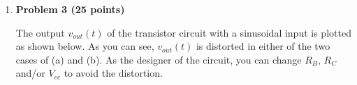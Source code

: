 \begin{enumerate}
\begin{comment}
    Apply KCL to the point between $C_1$ and $C_2$ denoted by $V$:
    \[
    \frac{V_{in}-V}{1/j\omega C_1}+\frac{V_{out}-V}{1/j\omega C_2}
    =\frac{V}{R_2}+\frac{V}{1/j\omega C_1}
    \]
    i.e.,
    \[
    V_{in}j\omega C_1+V_{out}j\omega C_2
    =\left(\frac{1}{R_2}+2j\omega C_1+j\omega C_2\right) V
    =\left(\frac{1}{R_2}+j\omega(2C_1+C_2)\right) V
    \]
    Apply KCL to the inverting input of the op-amp which is virtually
    grounded:
    \[
    \frac{V}{1/j\omega C_1}+\frac{V_{out}}{R_1}=0
    \;\;\;\;\;\;\mbox{i.e.}\;\;\;\;\;\;
    V=-\frac{1}{j\omega R_1C_1}V_{out}
    \]
    Substitute into the first equation
    \begin{eqnarray}
      V_{in}j\omega C_1+V_{out}j\omega C_2
      &=&-\left(\frac{1}{R_2}+j\omega(2C_1+C_2)\right) \frac{1}{j\omega R_1C_1}V_{out}
      \nonumber\\
      &=&-\left(\frac{1}{j\omega R_1R_2C_1}+\frac{2C_1+C_2}{R_1C_1}\right) V_{out}
      \nonumber
    \end{eqnarray}
    Rearrange:
    \[
    V_{in}
    =-\frac{1}{j\omega C_1}\left(j\omega C_2+\frac{1}{j\omega R_1R_2C_1}+\frac{2C_1+C_2}{R_1C_1}\right) V_{out}
    =\left(\frac{C_2}{C_1}+\frac{1}{(j\omega)^2 R_1R_2C^2_1}
    +\frac{2C_1+C_2}{j\omega R_1C_1^2}\right) V_{out}
    \]
    The FRF can be found to be:
    \begin{eqnarray}
      H(j\omega)&=&\frac{V_{out}}{V_{in}}
      =-\left(\frac{C_2}{C_1}+\frac{1}{(j\omega)^2 R_1R_2C_1^2}
      +\frac{2C_1+C_2}{j\omega R_1C_1^2}\right)^{-1}
      =-\frac{(j\omega)^2R_1R_2C_1^2}{(j\omega)^2R_1R_2C_1C_2+j\omega(2C_1+C_2)R_2+1}
      \nonumber\\
      &=&-\frac{C_1}{C_2}\;\frac{(j\omega)^2}{(j\omega)^2+j\omega(2C_1+C_2)/R_1C_1C_2+1/R_1R_2C_1C_2}
      =-\frac{C_1}{C_2}\;\frac{(j\omega)^2}{(j\omega)^2+j\omega\omega_n/Q+\omega_n^2}
      \nonumber
    \end{eqnarray}
    where
    \[
    \omega_n=\frac{1}{\sqrt{R_1R_2C_1C_2}},\;\;\;\;\;\;
    \frac{2C_1+C_2}{R_1C_1C_2}=\frac{\omega_n}{Q}=\Delta\omega,
    \;\;\;\mbox{i.e.,}\;\;\;\;
    Q=\omega_n\frac{R_1C_1C_2}{2C_1+C_2}=\frac{\sqrt{R_1R_2C_1C_2}}{(2C_1+C_2)R_2}
    \]
    This is a 2nd-order high-pass filter, when $\omega=\infty$, we have
    \[
    H(j\omega)\big|_{\omega=\infty}=H(j\infty)=-\frac{C_1}{C_2}
    \]
    \end{comment}

\item {\bf Problem 3 (25 points)}

  The output $v_{out}(t)$ of the transistor circuit with a sinusoidal input
  is plotted as shown below. As you can see, $v_{out}(t)$ is distorted in 
  either of the two cases of (a) and (b). As the designer of the circuit, 
  you can change $R_B$, $R_C$ and/or $V_{cc}$ to avoid the distortion. 


\end{enumerate}
